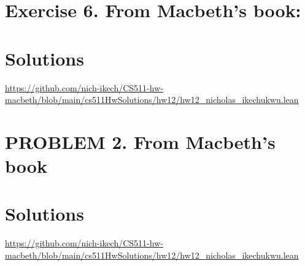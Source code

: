 \documentclass{article}
\begin{document}
\newpage


\section*{Exercise 6. From Macbeth’s book:}
\section*{Solutions}
\url{https://github.com/nich-ikech/CS511-hw-macbeth/blob/main/cs511HwSolutions/hw12/hw12_nicholas_ikechukwu.lean}

\newpage

\section*{PROBLEM 2. From Macbeth's book}
\section*{Solutions}

\url{https://github.com/nich-ikech/CS511-hw-macbeth/blob/main/cs511HwSolutions/hw12/hw12_nicholas_ikechukwu.lean}
\end{document}
